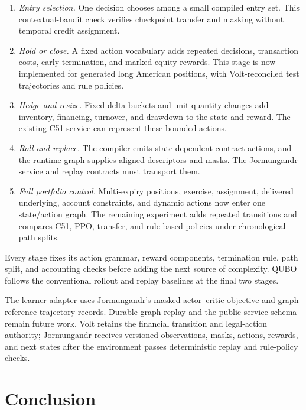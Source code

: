 \documentclass{strategynet-journal}
\newcommand{\VOLT}{\textsf{Volt}}
\begin{document}
\begin{enumerate}
  \item \emph{Entry selection.}  One decision chooses among a small compiled
        entry set.  This contextual-bandit check verifies checkpoint transfer
        and masking without temporal credit assignment.
  \item \emph{Hold or close.}  A fixed action vocabulary adds repeated
        decisions, transaction costs, early termination, and marked-equity
        rewards.  This stage is now implemented for generated long American
        positions, with Volt-reconciled test trajectories and rule policies.
  \item \emph{Hedge and resize.}  Fixed delta buckets and unit quantity changes
        add inventory, financing, turnover, and drawdown to the state and
        reward.  The existing C51 service can represent these bounded actions.
  \item \emph{Roll and replace.}  The compiler emits state-dependent contract
        actions, and the runtime graph supplies aligned descriptors and masks.
        The Jormungandr service and replay contracts must transport them.
  \item \emph{Full portfolio control.}  Multi-expiry positions, exercise,
        assignment, delivered underlying, account constraints, and dynamic
        actions now enter one state/action graph.  The remaining experiment
        adds repeated transitions and compares C51, PPO, transfer, and
        rule-based policies under chronological path splits.
\end{enumerate}

Every stage fixes its action grammar, reward components, termination rule,
path split, and accounting checks before adding the next source of
complexity.  QUBO follows the conventional rollout and replay baselines at
the final two stages.

The learner adapter uses Jormungandr's masked actor--critic objective and
graph-reference trajectory records.  Durable graph replay and the public
service schema remain future work.  \VOLT{} retains
the financial transition and legal-action authority; Jormungandr receives
versioned observations, masks, actions, rewards, and next states after the
environment passes deterministic replay and rule-policy checks.

\section{Conclusion}
\end{document}
